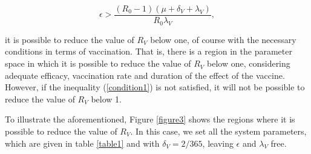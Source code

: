 \begin{equation}\label{condition1}
\epsilon>\frac{(R_0-1)(\mu+\delta_V+\lambda_V)}{R_0\lambda_V},
\end{equation}

\noindent it is possible to reduce the value of $ R_V $ below one, of course with the necessary conditions in terms of vaccination. That is, there is a region in the parameter space in which it is possible to reduce the value of $ R_V $ below one, considering adequate efficacy, vaccination rate and duration of the effect of the vaccine. However, if the inequality (\ref{condition1}) is not satisfied, it will not be possible to reduce the value of $ R_V $ below 1.

To illustrate the aforementioned, Figure \ref{figure3} shows the regions where it is possible to reduce the value of $ R_V $. In this case, we set all the system parameters, which are given in table \ref{table1} and with $ \delta_V = 2/365 $, leaving $ \epsilon $ and $ \lambda_V $ free. 


